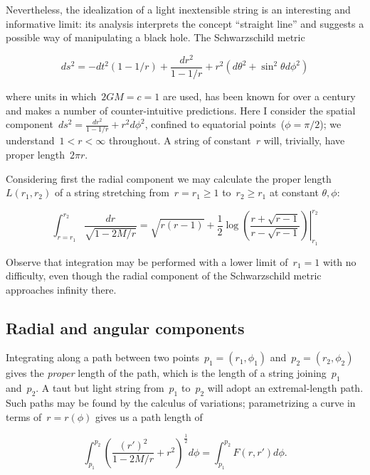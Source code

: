 \documentclass[times,twocolumn,final]{elsarticle}
\begin{document}
Nevertheless, the idealization of a light inextensible string is an
interesting and informative limit: its analysis interprets the concept
``straight line'' and suggests a possible way of manipulating a black
hole.  The Schwarzschild metric

\begin{equation}\label{schwarzschild}
ds^2= -dt^2\left(1-1/r\right) +\frac{dr^2}{1-1/r} + r^2\left(d\theta^2 + \sin^2\theta d\phi^2\right)
\end{equation}

where units in which~$2GM=c=1$ are used, has been known for over a
century and makes a number of counter-intuitive predictions.  Here I
consider the spatial component~$ds^2= \frac{dr^2}{1-1/r} +
r^2d\phi^2$, confined to equatorial points~($\phi=\pi/2$); we
understand~$1<r<\infty$ throughout.  A string of constant~$r$ will,
trivially, have proper length~$2\pi r$.

Considering first the radial component we may calculate the
proper length $L\left(r_1,r_2\right)$ of a string stretching
from~$r=r_1\geq 1$ to~$r_2\geq r_1$ at constant $\theta,\phi$:

\begin{equation}\label{radial_string_length}
  \int_{r=r_1}^{r_2}\frac{dr}{\sqrt{1-2M/r}}=
  \left.
  \sqrt{r(r-1)} +\frac{1}{2}\log\left(
  \frac{r+\sqrt{r-1}}{r-\sqrt{r-1}}\right)
  \right|_{r_1}^{r_2}
  \end{equation}

Observe that integration may be performed with a lower limit
of~$r_1=1$ with no difficulty, even though the radial component of the
Schwarzschild metric approaches infinity there.  

\subsection{Radial and angular components}

Integrating along a path between two
points~$p_1=\left(r_1,\phi_1\right)$ and~$p_2=\left(r_2,\phi_2\right)$
gives the {\em proper} length of the path, which is the length of a
string joining~$p_1$ and~$p_2$.  A taut but light string from~$p_1$
to~$p_2$ will adopt an extremal-length path.  Such paths may be found
by the calculus of variations; parametrizing a curve in terms
of~$r=r\left(\phi\right)$ gives us a path length of

\begin{equation}
  \int_{p_1}^{p_2}\left(\frac{\left(r'\right)^2}{1-2M/r} + r^2\right)^\frac{1}{2}d\phi=
  \int_{p_1}^{p_2}F\left(r,r'\right)d\phi.
\end{equation}
\end{document}
